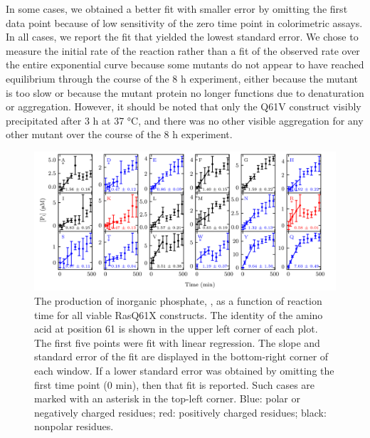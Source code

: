 In some cases, we obtained a better fit with smaller error by omitting the first data point because of low sensitivity of the zero time point in colorimetric assays. 
In all cases, we report the fit that yielded the lowest standard error. 
We chose to measure the initial rate of the reaction rather than a fit of the observed rate over the entire exponential curve because some mutants do not appear to have reached equilibrium through the course of the 8 h experiment, either because the mutant is too slow or because the mutant protein no longer functions due to denaturation or aggregation. 
However, it should be noted that only the Q61V construct visibly precipitated after 3 h at 37 \si{\celsius}, and there was no other visible aggregation for any other mutant over the course of the 8 h experiment.

\begin{figure} 
    \center
    \includegraphics[width=\double]{figures-ras/all_fits.png}
    \caption{
        The production of inorganic phosphate, , as a function of reaction time for all viable RasQ61X constructs. 
        The identity of the amino acid at position 61 is shown in the upper left corner of each plot. 
        The first five points were fit with linear regression. 
        The slope and standard error of the fit are displayed in the bottom-right corner of each window. 
        If a lower standard error was obtained by omitting the first time point (0 min), then that fit is reported. 
        Such cases are marked with an asterisk in the top-left corner. 
        Blue: polar or negatively charged residues; red: positively charged residues; black: nonpolar residues.
    }
    \label{fig:ras-all_fits}
\end{figure}

